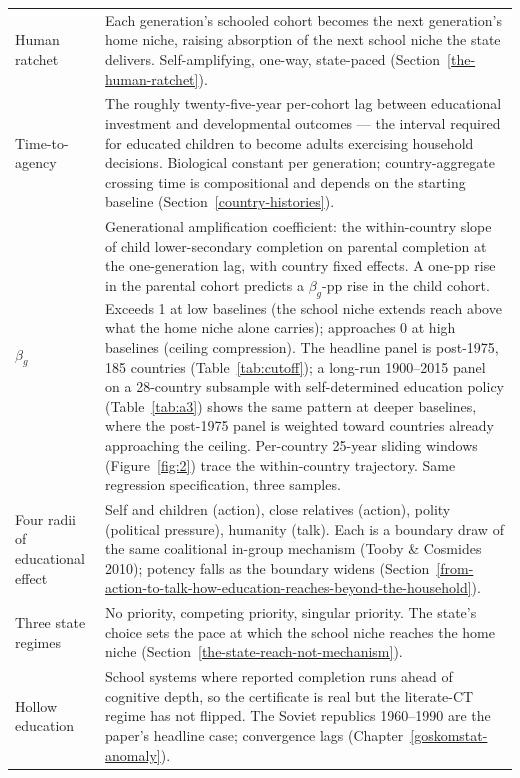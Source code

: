 \documentclass[12pt,letterpaper]{article}
\begin{document}
\begin{longtable}{@{}p{}p{}@{}}
Human ratchet &
Each generation's schooled cohort becomes the next generation's home
niche, raising absorption of the next school niche the state
delivers. Self-amplifying, one-way, state-paced
(Section~\ref{the-human-ratchet}). \\

Time-to-agency &
The roughly twenty-five-year per-cohort lag between educational
investment and developmental outcomes --- the interval required for
educated children to become adults exercising household decisions.
Biological constant per generation; country-aggregate crossing time
is compositional and depends on the starting baseline
(Section~\ref{country-histories}). \\

$\beta_g$ &
Generational amplification coefficient: the within-country slope of
child lower-secondary completion on parental completion at the
one-generation lag, with country fixed effects. A one-pp rise in
the parental cohort predicts a $\beta_g$-pp rise in the child cohort.
Exceeds 1 at low baselines (the school niche extends reach above
what the home niche alone carries); approaches 0 at high baselines
(ceiling compression). The headline panel is post-1975, 185 countries
(Table~\ref{tab:cutoff}); a long-run 1900--2015 panel on a
28-country subsample with self-determined education policy
(Table~\ref{tab:a3}) shows the same pattern at deeper baselines,
where the post-1975 panel is weighted toward countries already
approaching the ceiling. Per-country 25-year sliding windows
(Figure~\ref{fig:2}) trace the within-country trajectory. Same
regression specification, three samples. \\

Four radii of educational effect &
Self and children (action), close relatives (action), polity
(political pressure), humanity (talk). Each is a boundary draw of
the same coalitional in-group mechanism (Tooby \& Cosmides 2010);
potency falls as the boundary widens
(Section~\ref{from-action-to-talk-how-education-reaches-beyond-the-household}). \\

Three state regimes &
No priority, competing priority, singular priority. The state's
choice sets the pace at which the school niche reaches the home
niche (Section~\ref{the-state-reach-not-mechanism}). \\

Hollow education &
School systems where reported completion runs ahead of cognitive
depth, so the certificate is real but the literate-CT regime has not
flipped. The Soviet republics 1960--1990 are the paper's headline
case; convergence lags
(Chapter~\ref{goskomstat-anomaly}). \\

\bottomrule
\end{longtable}
\end{document}
